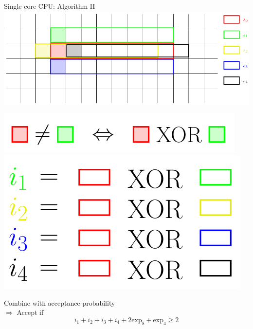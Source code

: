 \documentclass{beamer}
\begin{document}
\begin{frame}{Single core CPU: Algorithm II}
\includegraphics[keepaspectratio=true, width=\textwidth]{images/single_core2.png}\\ \pause
\begin{minipage}{0.5\textwidth}
    \includegraphics[keepaspectratio=true, width=\textwidth]{images/single_core3.png}\\ \pause
    \includegraphics[keepaspectratio=true, width=\textwidth]{images/single_core4.png} \pause
\end{minipage}
\hfill\vline\hfill \pause
\begin{minipage}{0.4\textwidth}
    Combine with acceptance probability\\
    $\Rightarrow$ Accept if
    \begin{equation*}
        i_1 + i_2 + i_3 + i_4 + 2 \text{exp}_8 + \text{exp}_4 \geq 2
    \end{equation*}
\end{minipage}
\end{frame}
\end{document}
